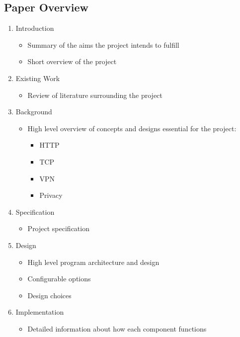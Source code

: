 \subsection{Paper Overview}
\begin{enumerate}
    \item Introduction
        \begin{itemize}
            \item Summary of the aims the project intends to fulfill
            \item Short overview of the project
        \end{itemize}
    \item Existing Work
        \begin{itemize}
            \item Review of literature surrounding the project
        \end{itemize}
    \item Background
        \begin{itemize}
            \item High level overview of concepts and designs essential for the project:
                \begin{itemize}
                    \item HTTP
                    \item TCP
                    \item VPN
                    \item Privacy
                \end{itemize}
        \end{itemize}
    \item Specification
        \begin{itemize}
            \item Project specification
        \end{itemize}
    \item Design
        \begin{itemize}
            \item High level program architecture and design
            \item Configurable options
            \item Design choices
        \end{itemize}
    \item Implementation
        \begin{itemize}
            \item Detailed information about how each component functions

\end{itemize}
\end{enumerate}
